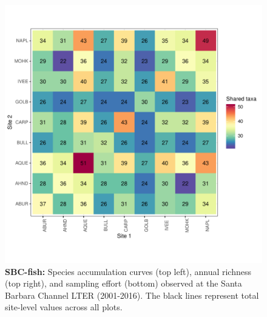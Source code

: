 \documentclass[11pt, oneside]{article}
\begin{document}
\begin{figure}[h!]
\includegraphics[scale = 0.4]{sbc-fish-castorani_spp_shared.pdf}
\caption{{\bf SBC-fish:} Species accumulation curves (top left),  annual richness (top right), and sampling effort (bottom)  observed at the Santa Barbara Channel LTER (2001-2016). The black lines represent total site-level values across all plots.}
\label{sbc-fish}
\end{figure}
\end{document}
